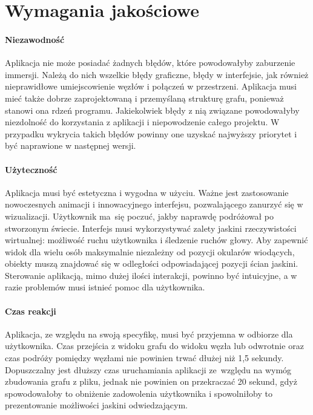 \section{Wymagania jakościowe}
\label{sec:wymagania-jakosciowe}

\paragraph{Niezawodność}
Aplikacja nie może posiadać żadnych błędów, które powodowałyby zaburzenie immersji. Należą do nich wszelkie błędy graficzne, błędy w interfejsie, jak również nieprawidłowe umiejscowienie węzłów i połączeń w przestrzeni. Aplikacja musi mieć także dobrze zaprojektowaną i przemyślaną strukturę grafu, ponieważ stanowi ona rdzeń programu. Jakiekolwiek błędy z nią związane powodowałyby niezdolność do korzystania z aplikacji i niepowodzenie całego projektu. W przypadku wykrycia takich błędów powinny one uzyskać najwyższy priorytet i być naprawione w następnej wersji.

\paragraph{Użyteczność}
Aplikacja musi być estetyczna i wygodna w użyciu. Ważne jest zastosowanie nowoczesnych animacji i innowacyjnego interfejsu, pozwalającego zanurzyć się w wizualizacji. Użytkownik ma~się poczuć, jakby naprawdę podróżował po stworzonym świecie. Interfejs musi wykorzystywać zalety jaskini rzeczywistości wirtualnej: możliwość ruchu użytkownika i śledzenie ruchów głowy. Aby zapewnić widok dla wielu osób maksymalnie niezależny od pozycji okularów wiodących, obiekty muszą znajdować się w odległości odpowiadającej pozycji ścian jaskini. Sterowanie aplikacją, mimo dużej ilości interakcji, powinno być intuicyjne, a w razie problemów musi istnieć pomoc dla użytkownika.

\paragraph{Czas reakcji}
Aplikacja, ze względu na swoją specyfikę, musi być przyjemna w odbiorze dla użytkownika. Czas przejścia z widoku grafu do widoku węzła lub odwrotnie oraz czas podróży pomiędzy węzłami nie powinien trwać dłużej niż 1,5 sekundy. Dopuszczalny jest dłuższy czas uruchamiania aplikacji ze~względu na wymóg zbudowania grafu z pliku, jednak nie powinien on przekraczać 20 sekund, gdyż spowodowałoby to obniżenie zadowolenia użytkownika i spowolniłoby to prezentowanie możliwości jaskini odwiedzającym. 
